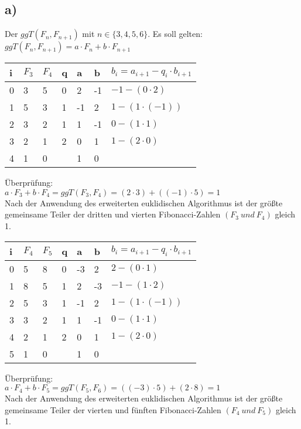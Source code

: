 \documentclass[11pt,a4paper]{article}
\begin{document}
\subsection*{a)}
Der $ggT(F_n, F_{n+1})$ mit $n \in \{3,4,5,6\}.$ Es soll gelten: $ggT(F_n, F_{n+1})=a\cdot F_n +b \cdot F_{n+1}$\\
\begin{center}
	\begin{tabular}{ | l | l | l | l | l | l | l|}
		\hline
		i&$F_3$&$F_4$&q&a&b&$b_i=a_{i+1}-q_i \cdot b_{i+1} $ \\
		\hline \hline
		0&3&5&0&2&-1&$-1-(0 \cdot 2 )$ \\ \hline
		1&5&3&1&-1&2&$1-(1 \cdot (-1))$ \\ \hline
		2&3&2&1&1&-1&$0-(1 \cdot 1)$ \\ \hline
		3&2&1&2&0&1&$1-(2\cdot 0)$ \\ \hline
		4&1&0&&1&0&\\ \hline
	\end{tabular}
\end{center}

Überprüfung:\\
$a\cdot F_3 +b \cdot F_4 = ggT(F_3,F_4)=(2\cdot 3)+((-1)\cdot5)=1$\\
Nach der Anwendung des erweiterten euklidischen Algorithmus ist der größte gemeinsame Teiler der dritten und vierten Fibonacci-Zahlen $(F_3~und~F_4)$ gleich 1.\\

\begin{center}
	\begin{tabular}{ | l | l | l | l | l | l | l|}
		\hline
		i&$F_4$&$F_5$&q&a&b&$b_i=a_{i+1}-q_i \cdot b_{i+1}$ \\ \hline	 \hline	
		0&5&8&0&-3&2&$2-(0 \cdot 1 )$ \\ \hline
		1&8&5&1&2&-3&$-1-(1 \cdot 2)$\\ \hline
		2&5&3&1&-1&2&$1-(1 \cdot (-1))$ \\ \hline
		3&3&2&1&1&-1&$0-(1 \cdot 1)$ \\ \hline
		4&2&1&2&0&1&$1-(2\cdot 0)$ \\ \hline
		5&1&0&&1&0&\\ \hline	
	\end{tabular}
\end{center}

Überprüfung:\\
$a\cdot F_4 +b \cdot F_5 = ggT(F_5,F_6)=((-3)\cdot5)+(2\cdot8)=1$\\
Nach der Anwendung des erweiterten euklidischen Algorithmus ist der größte gemeinsame Teiler der vierten und fünften Fibonacci-Zahlen $(F_4~und~F_5)$ gleich 1.\\
\end{document}
